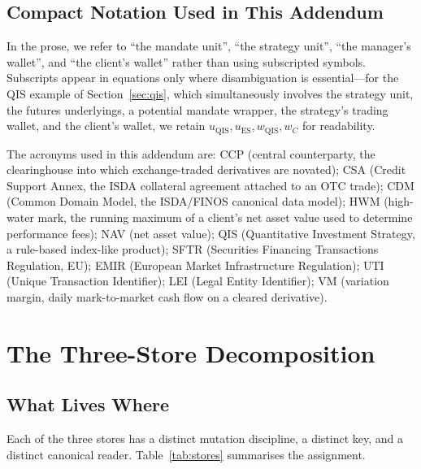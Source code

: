 \documentclass[11pt,a4paper]{article}
\begin{document}
\subsection{Compact Notation Used in This Addendum}

In the prose, we refer to ``the mandate unit'', ``the strategy unit'', ``the manager's wallet'', and ``the client's wallet'' rather than using subscripted symbols. Subscripts appear in equations only where disambiguation is essential---for the QIS example of Section~\ref{sec:qis}, which simultaneously involves the strategy unit, the futures underlyings, a potential mandate wrapper, the strategy's trading wallet, and the client's wallet, we retain $u_{\mathrm{QIS}}, u_{\mathrm{ES}}, w_{\mathrm{QIS}}, w_C$ for readability.

The acronyms used in this addendum are: CCP (central counterparty, the clearinghouse into which exchange-traded derivatives are novated); CSA (Credit Support Annex, the ISDA collateral agreement attached to an OTC trade); CDM (Common Domain Model, the ISDA/FINOS canonical data model); HWM (high-water mark, the running maximum of a client's net asset value used to determine performance fees); NAV (net asset value); QIS (Quantitative Investment Strategy, a rule-based index-like product); SFTR (Securities Financing Transactions Regulation, EU); EMIR (European Market Infrastructure Regulation); UTI (Unique Transaction Identifier); LEI (Legal Entity Identifier); VM (variation margin, daily mark-to-market cash flow on a cleared derivative).

\clearpage
\section{The Three-Store Decomposition}
\label{sec:threestore}

\subsection{What Lives Where}

Each of the three stores has a distinct mutation discipline, a distinct key, and a distinct canonical reader. Table~\ref{tab:stores} summarises the assignment.
\end{document}
